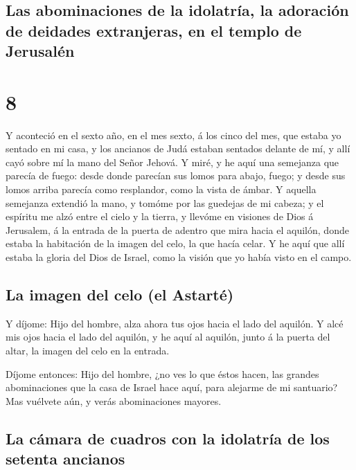 \hypertarget{las-abominaciones-de-la-idolatruxeda-la-adoraciuxf3n-de-deidades-extranjeras-en-el-templo-de-jerusaluxe9n}{%
\subsection{Las abominaciones de la idolatría, la adoración de deidades
extranjeras, en el templo de
Jerusalén}\label{las-abominaciones-de-la-idolatruxeda-la-adoraciuxf3n-de-deidades-extranjeras-en-el-templo-de-jerusaluxe9n}}

\hypertarget{section-26-8}{%
\section{8}\label{section-26-8}}

 Y aconteció en el sexto año, en el mes sexto, á los cinco
del mes, que estaba yo sentado en mi casa, y los ancianos de Judá
estaban sentados delante de mí, y allí cayó sobre mí la mano del Señor
Jehová.  Y miré, y he aquí una semejanza que parecía de
fuego: desde donde parecían sus lomos para abajo, fuego; y desde sus
lomos arriba parecía como resplandor, como la vista de ámbar.
 Y aquella semejanza extendió la mano, y tomóme por las
guedejas de mi cabeza; y el espíritu me alzó entre el cielo y la tierra,
y llevóme en visiones de Dios á Jerusalem, á la entrada de la puerta de
adentro que mira hacia el aquilón, donde estaba la habitación de la
imagen del celo, la que hacía celar.  Y he aquí que allí
estaba la gloria del Dios de Israel, como la visión que yo había visto
en el campo.

\hypertarget{la-imagen-del-celo-el-astartuxe9}{%
\subsection{La imagen del celo (el
Astarté)}\label{la-imagen-del-celo-el-astartuxe9}}

 Y díjome: Hijo del hombre, alza ahora tus ojos hacia el
lado del aquilón. Y alcé mis ojos hacia el lado del aquilón, y he aquí
al aquilón, junto á la puerta del altar, la imagen del celo en la
entrada.

 Díjome entonces: Hijo del hombre, ¿no ves lo que éstos
hacen, las grandes abominaciones que la casa de Israel hace aquí, para
alejarme de mi santuario? Mas vuélvete aún, y verás abominaciones
mayores.

\hypertarget{la-cuxe1mara-de-cuadros-con-la-idolatruxeda-de-los-setenta-ancianos}{%
\subsection{La cámara de cuadros con la idolatría de los setenta
ancianos}\label{la-cuxe1mara-de-cuadros-con-la-idolatruxeda-de-los-setenta-ancianos}}

